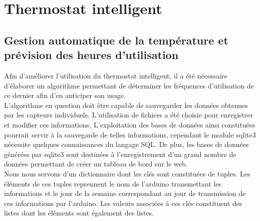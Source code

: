 \documentclass[12pt]{report}
\begin{document}


\chapter{\label{intelligent}Thermostat intelligent}
\section{Gestion automatique de la température et prévision des heures d'utilisation} 
Afin d’améliorer l'utilisation du thermostat intelligent, il a été nécessaire d’élaborer un algorithme permettant de déterminer les fréquences d'utilisation de ce dernier afin d’en anticiper son usage.\\

\noindent
L’algorithme en question doit être capable de sauvegarder les données obtenues par les capteurs individuels. L’utilisation de fichiers a été choisie pour enregistrer et modifier ces informations. L’exploitation des bases de données ainsi constituées pourrait servir à la sauvegarde de telles informations, cependant le module sqlite3 nécessite quelques connaissances du langage SQL.
De plus, les bases de données générées par sqlite3 sont destinées à l’enregistrement d’un grand nombre de données permettant de créer un tableau de bord sur le web.\\

\noindent
Nous nous servons d’un dictionnaire dont les clés sont constituées de tuples. Les éléments de ces tuples reprennent le nom de l’arduino transmettant les informations et le jour de la semaine correspondant au jour de transmission de ces informations par l’arduino. Les valeurs associées à ces clés constituent des listes dont les éléments sont également des listes.\\
\end{document}
